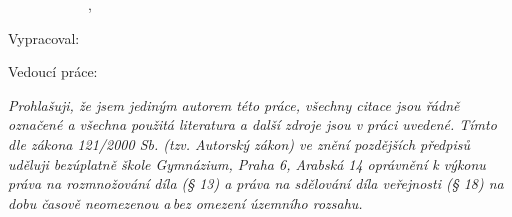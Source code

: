 \pagestyle{empty}
\hypersetup{pageanchor=false}

\begin{center}
	\begin{figure}[h!]
		\begin{center}
			\begin{subfigure}[b]{0.1\linewidth}
				\def\svgwidth{\columnwidth}\scalebox{1}{}
			\end{subfigure}
			\begin{subfigure}[b]{0.8\linewidth}
				{\LARGE\bfseries\NazevSkoly}

				\vspace{3mm}

				{\LARGE\TypPrace, \NazevOboru}
				\vspace{-1mm}
			\end{subfigure}
		\end{center}
	\end{figure}

	\vfill

	\def\svgwidth{\columnwidth}\scalebox{0.3}{}

	\vfill

	{\bf\Huge\NazevPraceShort}

	\vspace{3.5mm}
	{\bf\Large\NazevPrace}

	\vfill
	\vfill

	Vypracoval: \hfill \AutorPrace

	Vedoucí práce: \hfill \VedouciPrace

	\vspace{5mm}
	\DatumOdevzdani
\end{center}

\newpage
\hypersetup{pageanchor=true}
\pagestyle{plain}

\openright

\vspace*{\fill}

\noindent
\textit{
	Prohlašuji, že jsem jediným autorem této práce, všechny citace jsou řádně označené
	a všechna použitá literatura a další zdroje jsou v práci uvedené. Tímto dle zákona
	121/2000 Sb. (tzv. Autorský zákon) ve znění pozdějších předpisů uděluji bezúplatně škole
	Gymnázium, Praha 6, Arabská 14 oprávnění k výkonu práva na rozmnožování díla (§ 13) a
	práva na sdělování díla veřejnosti (§ 18) na dobu časově neomezenou a\,bez omezení
	územního rozsahu.
}

